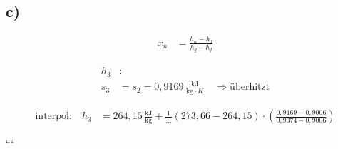 

\subsection*{c)}

\begin{align*}
    x_n &= \frac{h_n - h_f}{h_g - h_f}
\end{align*}

\begin{align*}
    h_3 &: \\
    s_3 &= s_2 = 0,9169 \, \frac{\text{kJ}}{\text{kg} \cdot K} \quad \Rightarrow \text{überhitzt}
\end{align*}

\begin{align*}
    \text{interpol:} \quad h_3 &= 264,15 \, \frac{\text{kJ}}{\text{kg}} + \frac{1}{\ldots} \left( 273,66 - 264,15 \right) \cdot \left( \frac{0,9169 - 0,9006}{0,9374 - 0,9006} \right)
\end{align*}

```